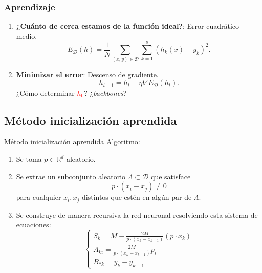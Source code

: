 \documentclass{beamer}
\newcommand{\R}{\mathbb{R}}
\begin{document}
\begin{frame}
\frametitle{Aprendizaje} 
\begin{enumerate}
    \item \textbf{¿Cuánto de cerca estamos de la función ideal?}: Error cuadrático medio. 
    \begin{equation*}
        E_{\mathcal{D}}(h) = \frac{1}{N} \sum_{(x,y) \in \mathcal{D}} \sum_{k=1}^s(h_k(x)- y_k)^2. 
    \end{equation*}
    \pause 
   \item  \textbf{Minimizar el error}: Descenso de gradiente. 
    \begin{equation*}
        h_{t+1}  = h_t - \eta \nabla E_{\mathcal{D}}(h_t).
    \end{equation*}  
    \pause
    ¿Cómo determinar  \textcolor{red}{$h_0$}? 
    ¿\textit{backbones}?
\end{enumerate}
    

\end{frame}
\subsection{Método inicialización aprendida}
\begin{frame}{Método inicialización aprendida}
    Algoritmo: 
    \begin{enumerate}
        \item Se toma $p \in \R^d$  aleatorio. 
        \item Se extrae un subconjunto aleatorio  $\Lambda \subset \mathcal{D}$
        que satisface 
        \begin{equation*}
            p \cdot (x_i-x_j) \neq 0
        \end{equation*}
        para cualquier $x_i,x_j$ distintos que estén en algún par de $\Lambda$.
        \item Se construye de manera recursiva la red neuronal resolviendo esta sistema de ecuaciones: 
        \begin{equation*}
            \left\{ 
                \begin{array}{l}
                    S_{k} =
                        M -  \frac{2 M}{p \cdot (x_k - x_{k-1})}(p \cdot x_{k})
                    \\
                    A_{k i} = \frac{2 M}{p \cdot (x_k - x_{k-1})}
                    p_{i} 
                    \\
                    B_{* k} = y_k - y_{k-1}
                \end{array}
            \right.
        \end{equation*} 
\end{enumerate}
 
\end{frame}
\end{document}
